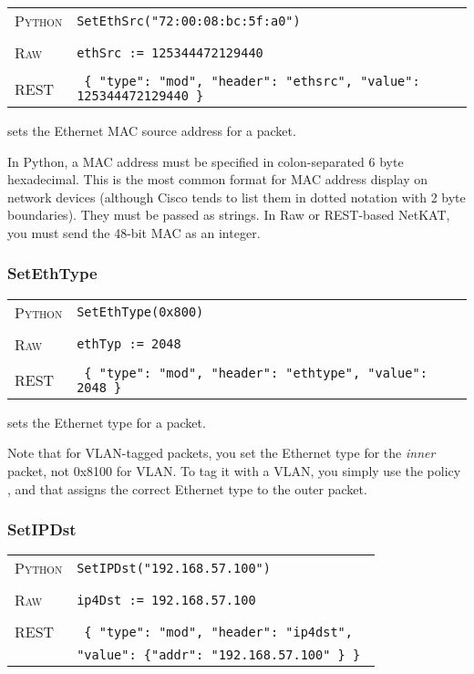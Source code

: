 \bigskip
\begin{tabularx}{\linewidth}{lX}
\textsc{Python}   & \texttt{SetEthSrc("72:00:08:bc:5f:a0")} \\ \\
\textsc{Raw}    & \texttt{ethSrc := 125344472129440}     \\ \\
\textsc{REST} & \texttt{ \{ "type": "mod", "header": "ethsrc", "value": 125344472129440 \} }
\end{tabularx}

 sets the Ethernet MAC source address for a packet.    

In Python, a MAC address must be specified in colon-separated 6 byte hexadecimal.  This is the most common format
for MAC address display on network devices (although Cisco tends to list them in dotted notation with 2 byte
boundaries).  They must be passed as strings.  In Raw or REST-based NetKAT, you must send the 48-bit MAC as 
an integer.  

\subsubsection{SetEthType}

\bigskip
\begin{tabularx}{\linewidth}{lX}
\textsc{Python}   & \texttt{SetEthType(0x800)} \\ \\
\textsc{Raw}    & \texttt{ethTyp := 2048}     \\ \\
\textsc{REST} & \texttt{ \{ "type": "mod", "header": "ethtype", "value": 2048 \} }
\end{tabularx}

 sets the Ethernet type for a packet.    

Note that for VLAN-tagged packets, you set the Ethernet type for the \emph{inner} packet, not 0x8100
for VLAN.  To tag it with a VLAN, you simply use the policy , and that assigns the
correct Ethernet type to the outer packet.  

\subsubsection{SetIPDst}

\bigskip
\begin{tabularx}{\linewidth}{lX}
\textsc{Python}   & \texttt{SetIPDst("192.168.57.100")} \\ \\
\textsc{Raw}    & \texttt{ip4Dst := 192.168.57.100}     \\ \\
\textsc{REST} & \texttt{ \{ "type": "mod", "header": "ip4dst", } \\
  & \texttt{"value": \{"addr": "192.168.57.100" \} \} }
\end{tabularx}

